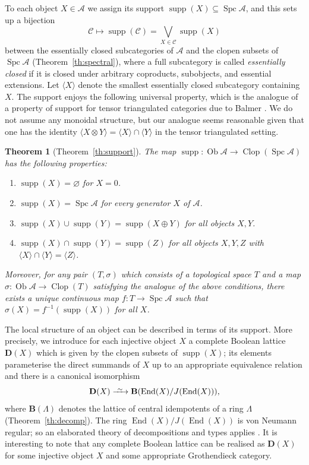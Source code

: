\documentclass[a4paper]{amsart}
\theoremstyle{plain}
\newtheorem*{Thm}{Theorem}
\theoremstyle{definition}
\theoremstyle{remark}
\numberwithin{equation}{section}
\newcommand{\Clop}{\operatorname{Clop}}
\newcommand{\End}{\operatorname{End}}
\newcommand{\Ob}{\operatorname{Ob}}
\newcommand{\Spc}{\operatorname{Spc}}
\newcommand{\supp}{\operatorname{supp}}
\newcommand{\longiso}{\xrightarrow{\ \raisebox{-.4ex}[0ex][0ex]{$\scriptstyle{\sim}$}\ }}
\def\A{\mathcal A}
\def\C{\mathcal C}
\def\bfB{\mathbf B}
\def\bfD{\mathbf D}
\def\s{\sigma}
\def\La{\Lambda}
\begin{document}
To each object $X\in\A$ we assign its support
$\supp(X)\subseteq\Spc\A$, and this sets up a bijection
\begin{equation}\label{eq:supp(C)}
  \C \longmapsto\supp(\C)=\bigvee_{X\in\C}\supp(X)
\end{equation}
between the essentially closed subcategories of $\A$ and the clopen subsets of
$\Spc\A$ (Theorem~\ref{th:spectral}), where a full subcategory is
called \emph{essentially closed} if it is closed under arbitrary coproducts,
subobjects, and essential extensions. Let $\langle X\rangle$ denote
the smallest essentially closed subcategory containing $X$. The support enjoys
the following universal property, which is the analogue of a property
of support for tensor triangulated categories due to Balmer
\cite{Ba2005}. We do not assume any monoidal structure, but our
analogue seems reasonable given that one has the identity
$\langle X\otimes Y\rangle=\langle X\rangle\cap \langle Y\rangle$ in
the tensor triangulated setting.

\begin{Thm}[Theorem~\ref{th:support}]
  The map $\supp\colon\Ob\A\to\Clop(\Spc\A)$ has the following properties:
\begin{enumerate}
\item[(S$0$)] $\supp(X)=\varnothing$ for $X=0$.
\item[(S$1$)] $\supp(X)=\Spc\A$ for every generator $X$ of $\A$.
\item[(S$\vee$)] $\supp(X)\cup\supp(Y)=\supp(X\oplus Y)$ for all objects $X,Y$.
\item[(S$\wedge$)] $\supp(X)\cap\supp(Y)=\supp(Z)$ for all objects $X,Y,Z$ 
  with $\langle X\rangle\cap \langle Y\rangle=\langle Z\rangle$.
\end{enumerate}
Moreover, for any pair $(T,\s)$ which consists of a topological space
$T$ and a map $\s\colon\Ob\A\to\Clop(T)$ satisfying the analogue of
the above conditions, there exists a unique continuous map
$f\colon T\to \Spc\A$ such that $\s(X)=f^{-1}(\supp(X))$ for all $X$.
\end{Thm}

The local structure of an object can be described in terms of its
support. More precisely, we introduce for each injective object $X$ a
complete Boolean lattice $\bfD(X)$ which is given by the clopen subsets of
$\supp(X)$; its elements parameterise the direct summands of $X$ up to
an appropriate equivalence relation and there is a canonical
isomorphism
\[\bfD(X)\longiso\bfB(\End(X)/J(\End(X))),\] where $\bfB(\La)$ denotes 
the lattice of central idempotents of a ring $\La$
(Theorem~\ref{th:decomp}). The ring $\End(X)/J(\End(X))$ is von
Neumann regular; so an elaborated theory of decompositions and types
applies \cite{Ka1951,MvN1936}. It is interesting to note that any
complete Boolean lattice can be realised as $\bfD(X)$ for some
injective object $X$ and some appropriate Grothendieck category.
\end{document}
